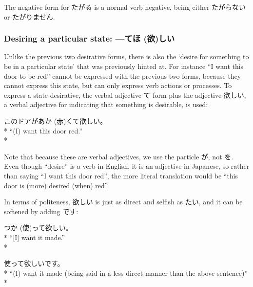 \documentclass[11pt, b5paper, twoside, openright, onecolumn]{book}
\makeatletter
\newcommand*{\rubystack}[2]{{\relscale{0.5}%
  \begin{tabular}[b]{@{}c@{}}%
    {#1}\\%
   {\textscale{2}{#2}}%
  \end{tabular}}%
}
\DeclareRobustCommand*{\ruby}[2]{%
  \mbox{%
    \setlength{\parskip}{0ex}%
    \BeginAccSupp{method=pdfstringdef,ActualText={#1}}%
      \rubystack{\phantom{#2}}{#1}%
      \llap{%
        \rubystack{#2}{\phantom{#1}}%
      }%
    \EndAccSupp{}%
  }%
}
\renewcommand*{\ruby}[2]{#2 (#1)}%
\newenvironment{exampleblock}{
\setlength{\parindent}{0.6in}
\begin{minipage}[t]{\dimexpr\textwidth-\parindent}}
{\end{minipage}}
\makeatother
\begin{document}
The negative form for たがる is a normal verb negative‚ being either たがらない or たがりません.

\subsubsection{Desiring a particular state: —て\ruby{欲}{ほ}しい}

Unlike the previous two desirative forms‚ there is also the ‘desire for something to be in a particular state’ that was previously hinted at. For instance “I want this door to be red” cannot be expressed with the previous two forms‚ because they cannot express this state‚ but can only express verb actions or processes. To express a state desirative‚ the verbal adjective て form plus the adjective 欲しい‚ a verbal adjective for indicating that something is desirable‚ is used:

\vspace{0.4cm}
\begin{exampleblock}
このドアが\ruby{赤}{あか}くて欲しい。 \\* 
“(I) want this door red.” \\* 
\end{exampleblock}
\vspace{0.2cm}

Note that because these are verbal adjectives‚ we use the particle が‚ not を. Even though “desire” is a verb in English‚ it is an adjective in Japanese‚ so rather than saying “I want this door red”‚ the more literal translation would be “this door is (more) desired (when) red”.

In terms of politeness‚ 欲しい is just as direct and selfish as たい‚ and it can be softened by adding です:

\vspace{0.4cm}
\begin{exampleblock}
\ruby{使}{つか}って欲しい。 \\* 
“[I] want it made.” \\* 
\end{exampleblock}
\vspace{0.2cm}

\begin{exampleblock}
使って欲しいです。 \\* 
“(I) want it made (being said in a less direct manner than the above sentence)” \\* 
\end{exampleblock}
\vspace{0.2cm}
\end{document}
